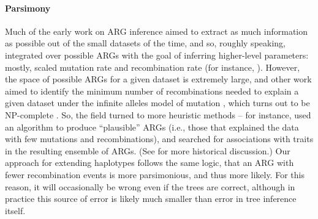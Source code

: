 \documentclass[10pt,twoside,lineno]{gsajnl}
\begin{document}
\paragraph{Parsimony}
Much of the early work on ARG inference aimed to extract as much information as possible
out of the small datasets of the time,
and so, roughly speaking, integrated over possible ARGs
with the goal of inferring higher-level parameters:
mostly, scaled mutation rate and recombination rate
(for instance, \citet{hudson1985statistical,griffiths1996ancestral,kuhner2000maximum,stephens2000inference,fearnhead2001estimating}).
However, the space of possible ARGs for a given dataset is extremely large,
and other work aimed to identify the minimum number of recombinations
needed to explain a given dataset under the infinite alleles model of mutation
\citep[e.g.,][]{hein1990reconstructing,myers2003bounds,song2005constructing},
which turns out to be NP-complete \citep{wang2001perfect}.
So, the field turned to more heuristic methods --
for instance, \citet{minichiello2006mapping}
used an algorithm to produce ``plausible'' ARGs
(i.e., those that explained the data with few mutations and recombinations),
and searched for associations with traits in the resulting ensemble of ARGs.
(See \citet{wong2024general} for more historical discussion.)
Our approach for extending haplotypes follows the same logic,
that an ARG with fewer recombination events is more parsimonious,
and thus more likely.
For this reason, it will occasionally be wrong even if the trees are correct,
although in practice this source of error is likely much smaller than error in tree inference itself.
\end{document}
